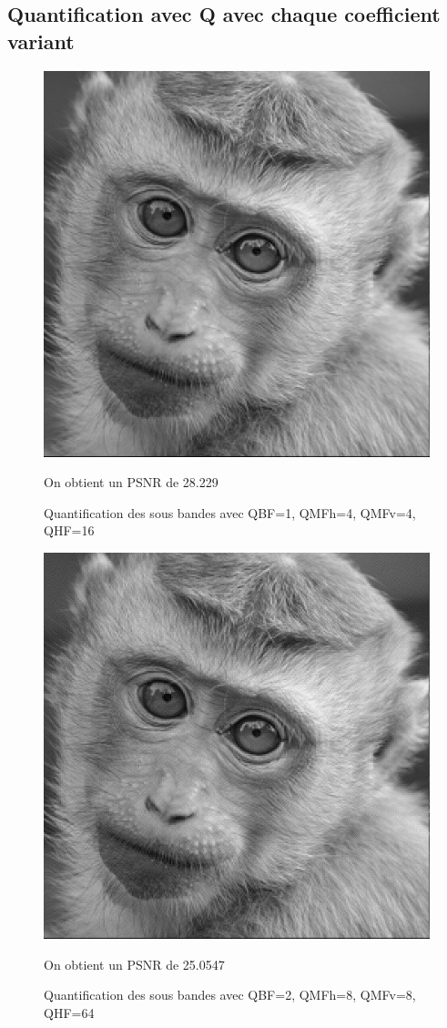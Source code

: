 \documentclass{article}
\begin{document}
\subsection{Quantification avec Q avec chaque coefficient variant}
\begin{figure}[h!]
\centerline{ \includegraphics[scale=0.5]{./rendus/ReconstruiteQuantificationCoeff1_4_4_16.png} }
\caption{Quantification des sous bandes avec QBF=1, QMFh=4, QMFv=4, QHF=16} 
On obtient un PSNR de 28.229
\end{figure}


\begin{figure}[h!]
\centerline{ \includegraphics[scale=0.5]{./rendus/ReconstruiteQuantificationCoeff2_8_8_64.png} }
\caption{Quantification des sous bandes avec QBF=2, QMFh=8, QMFv=8, QHF=64} 
On obtient un PSNR de 25.0547
\end{figure}
\end{document}
